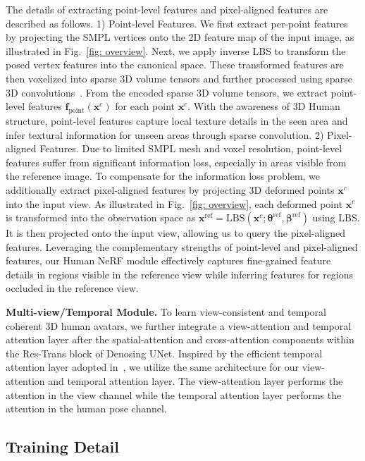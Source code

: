 The details of extracting point-level features and pixel-aligned features are described as follows.
1) Point-level Features. 
We first extract per-point features by projecting the SMPL vertices onto the 2D feature map of the input image, as illustrated in Fig.~\ref{fig: overview}.
Next, we apply inverse LBS to transform the posed vertex features into the canonical space. 
These transformed features are then voxelized into sparse 3D volume tensors and further processed using sparse 3D convolutions~\cite{spconv2022}. 
From the encoded sparse 3D volume tensors, we extract point-level features $\bm{f}_\text{point}(\bm{x}^{c})$ for each point $\bm{x}^{c}$.
With the awareness of 3D Human structure, point-level features capture local texture details in the seen area and infer textural information for unseen areas through sparse convolution.
2) Pixel-aligned Features. 
Due to limited SMPL mesh and voxel resolution, point-level features suffer from significant information loss, especially in areas visible from the reference image.
To compensate for the information loss problem, we additionally extract pixel-aligned features by projecting 3D deformed points $\bm{x}^{c}$ into the input view.
As illustrated in Fig.~\ref{fig: overview}, each deformed point $\bm{x}^{c}$ is transformed into the observation space as $\bm{x}^\text{ref} = \text{LBS}(\bm{x}^{c}; \bm{\theta}^\text{ref}, \bm{\beta}^\text{ref})$ using LBS. 
It is then projected onto the input view, allowing us to query the pixel-aligned features.
Leveraging the complementary strengths of point-level and pixel-aligned features, our Human NeRF module effectively captures fine-grained feature details in regions visible in the reference view while inferring features for regions occluded in the reference view.

\noindent \textbf{Multi-view/Temporal Module.}
To learn view-consistent and temporal coherent 3D human avatars, we further integrate a view-attention and temporal attention layer after the spatial-attention and cross-attention components within the Res-Trans block of Denosing UNet. 
Inspired by the efficient temporal attention layer adopted in~\cite{hu2024animate, guo2023animatediff}, we utilize the same architecture for our view-attention and temporal attention layer.
The view-attention layer performs the attention in the view channel while the temporal attention layer performs the attention in the human pose channel.

\subsection{Training Detail}
\label{sec:training_detail}


